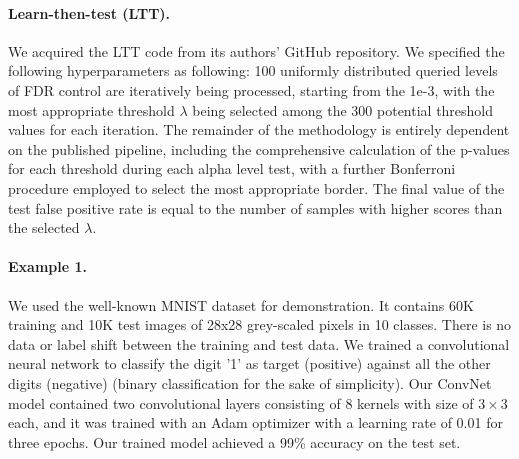 \documentclass{article}
\begin{document}
\paragraph{Learn-then-test (LTT).} We acquired the LTT code from its authors' GitHub repository. We  specified the following hyperparameters as following: 100 uniformly distributed queried levels of FDR control are iteratively being processed, starting from the 1e-3, with the most appropriate threshold $\lambda$ being selected among the 300 potential threshold values for each iteration. The remainder of the methodology is entirely dependent on the published pipeline, including the comprehensive calculation of the p-values for each threshold during each alpha level test, with a further Bonferroni procedure employed to select the most appropriate border. The final value of the test false positive rate is equal to the number of samples with higher scores than the selected $\lambda$. 

\paragraph{Example 	 1.} \label{ex:vanilla} We used the well-known MNIST dataset for demonstration. It contains 60K training and 10K test images of 28x28 grey-scaled pixels in 10 classes. There is no data or label shift between the training and test data. We trained a convolutional neural network to classify the digit '1' as target (positive) against all the other digits (negative) (binary classification for the sake of simplicity). Our ConvNet model contained two convolutional layers consisting of 8 kernels with size of $3\times3$ each, and it was trained with an Adam optimizer with a learning rate of 0.01 for three epochs. Our trained model achieved a 99\% accuracy on the test set. 
\end{document}

